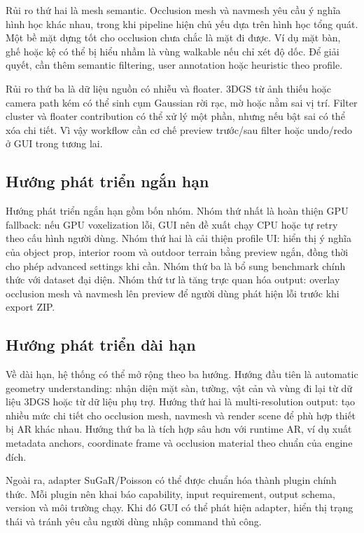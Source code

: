 Rủi ro thứ hai là mesh semantic. Occlusion mesh và navmesh yêu cầu ý nghĩa hình học khác nhau, trong khi pipeline hiện chủ yếu dựa trên hình học tổng quát. Một bề mặt dựng tốt cho occlusion chưa chắc là mặt đi được. Ví dụ mặt bàn, ghế hoặc kệ có thể bị hiểu nhầm là vùng walkable nếu chỉ xét độ dốc. Để giải quyết, cần thêm semantic filtering, user annotation hoặc heuristic theo profile.

Rủi ro thứ ba là dữ liệu nguồn có nhiễu và floater. 3DGS từ ảnh thiếu hoặc camera path kém có thể sinh cụm Gaussian rời rạc, mờ hoặc nằm sai vị trí. Filter cluster và floater contribution có thể xử lý một phần, nhưng nếu bật sai có thể xóa chi tiết. Vì vậy workflow cần cơ chế preview trước/sau filter hoặc undo/redo ở GUI trong tương lai.

\subsection{Hướng phát triển ngắn hạn}

Hướng phát triển ngắn hạn gồm bốn nhóm. Nhóm thứ nhất là hoàn thiện GPU fallback: nếu GPU voxelization lỗi, GUI nên đề xuất chạy CPU hoặc tự retry theo cấu hình người dùng. Nhóm thứ hai là cải thiện profile UI: hiển thị ý nghĩa của object prop, interior room và outdoor terrain bằng preview ngắn, đồng thời cho phép advanced settings khi cần. Nhóm thứ ba là bổ sung benchmark chính thức với dataset đại diện. Nhóm thứ tư là tăng trực quan hóa output: overlay occlusion mesh và navmesh lên preview để người dùng phát hiện lỗi trước khi export ZIP.

\subsection{Hướng phát triển dài hạn}

Về dài hạn, hệ thống có thể mở rộng theo ba hướng. Hướng đầu tiên là automatic geometry understanding: nhận diện mặt sàn, tường, vật cản và vùng đi lại từ dữ liệu 3DGS hoặc từ dữ liệu phụ trợ. Hướng thứ hai là multi-resolution output: tạo nhiều mức chi tiết cho occlusion mesh, navmesh và render scene để phù hợp thiết bị AR khác nhau. Hướng thứ ba là tích hợp sâu hơn với runtime AR, ví dụ xuất metadata anchors, coordinate frame và occlusion material theo chuẩn của engine đích.

Ngoài ra, adapter SuGaR/Poisson có thể được chuẩn hóa thành plugin chính thức. Mỗi plugin nên khai báo capability, input requirement, output schema, version và môi trường chạy. Khi đó GUI có thể phát hiện adapter, hiển thị trạng thái và tránh yêu cầu người dùng nhập command thủ công.


